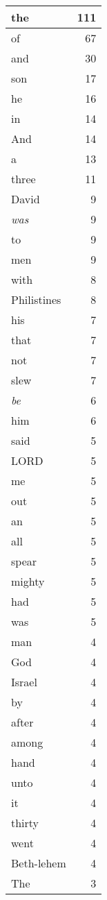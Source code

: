 \begin{center}
\begin{longtable}{l|r}
\hline \hline
\endlastfoot
the & 111 \\ \hline
of & 67 \\ \hline
and & 30 \\ \hline
son & 17 \\ \hline
he & 16 \\ \hline
in & 14 \\ \hline
And & 14 \\ \hline
a & 13 \\ \hline
three & 11 \\ \hline
David & 9 \\ \hline
\emph{was} & 9 \\ \hline
to & 9 \\ \hline
men & 9 \\ \hline
with & 8 \\ \hline
Philistines & 8 \\ \hline
his & 7 \\ \hline
that & 7 \\ \hline
not & 7 \\ \hline
slew & 7 \\ \hline
\emph{be} & 6 \\ \hline
him & 6 \\ \hline
said & 5 \\ \hline
LORD & 5 \\ \hline
me & 5 \\ \hline
out & 5 \\ \hline
an & 5 \\ \hline
all & 5 \\ \hline
spear & 5 \\ \hline
mighty & 5 \\ \hline
had & 5 \\ \hline
was & 5 \\ \hline
man & 4 \\ \hline
God & 4 \\ \hline
Israel & 4 \\ \hline
by & 4 \\ \hline
after & 4 \\ \hline
among & 4 \\ \hline
hand & 4 \\ \hline
unto & 4 \\ \hline
it & 4 \\ \hline
thirty & 4 \\ \hline
went & 4 \\ \hline
Beth-lehem & 4 \\ \hline
The & 3 \\ \hline

\end{longtable}
\end{center}
